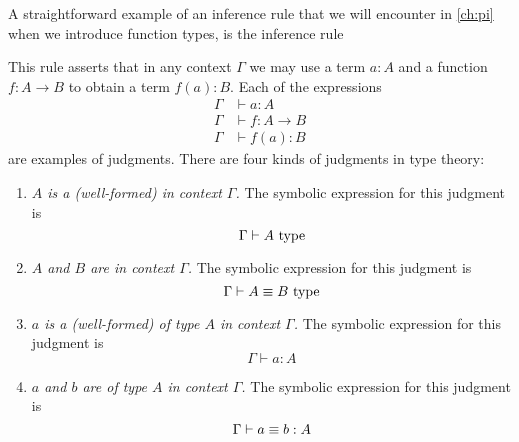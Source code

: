 A straightforward example of an inference rule that we will encounter in \cref{ch:pi} when we introduce function types, is the inference rule
\begin{prooftree}
\end{prooftree}
This rule asserts that in any context $\Gamma$ we may use a term $a:A$ and a function $f:A\to B$ to obtain a term $f(a):B$. Each of the expressions
\begin{align*}
  \Gamma & \vdash a :A \\
  \Gamma & \vdash f : A \to B \\
  \Gamma & \vdash f(a):B
\end{align*}
are examples of judgments. There are four kinds of judgments in type theory:
\begin{enumerate}
\item \emph{$A$ is a (well-formed)  in context $\Gamma$.}
  The symbolic expression for this judgment is
  \begin{equation*}
    \Gamma\vdash A~\type
  \end{equation*}
\item \emph{$A$ and $B$ are  in context $\Gamma$.}
   The symbolic expression for this judgment is
  \begin{equation*}
    \Gamma\vdash A \jdeq B~\type
  \end{equation*}
\item \emph{$a$ is a (well-formed)  of type $A$ in context $\Gamma$.} The symbolic expression for this judgment is
  \begin{equation*}
    \Gamma \vdash a:A
  \end{equation*}
\item \emph{$a$ and $b$ are  of type $A$ in context $\Gamma$.} The symbolic expression for this judgment is
  \begin{equation*}
    \Gamma\vdash a\jdeq b:A
  \end{equation*}
\end{enumerate}

